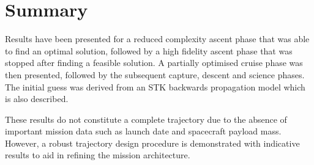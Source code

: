 \section{Summary} \label{sec:Results-summary}

Results have been presented for a reduced complexity ascent phase that was able to find an optimal solution, followed by a high fidelity ascent phase that was stopped after finding a feasible solution. A partially optimised cruise phase was then presented, followed by the subsequent capture, descent and science phases. The initial guess was derived from an STK backwards propagation model which is also described.

These results do not constitute a complete trajectory due to the absence of important mission data such as launch date and spacecraft payload mass. However, a robust trajectory design procedure is demonstrated with indicative results to aid in refining the mission architecture. 

